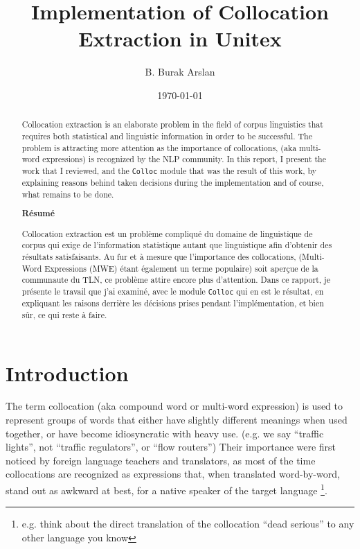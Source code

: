 \documentclass[a4paper,12pt,oneside]{article}
\title{Implementation of Collocation Extraction in Unitex}
\author{B. Burak Arslan}
\date{\today}
\begin{document}
\maketitle
\begin{abstract}
Collocation extraction is an elaborate problem in the field of corpus linguistics that requires both statistical and linguistic information in order to be successful. The problem is attracting more attention as the importance of collocations, (aka multi-word expressions) is recognized by the NLP community. In this report, I present the work that I reviewed, and the \texttt{Colloc} module that was the result of this work, by explaining reasons behind taken decisions during the implementation and of course, what remains to be done.

\begin{center}
\textbf{Résumé}
\end{center}

Collocation extraction est un problème compliqué du domaine de
linguistique de corpus qui exige de l'information statistique autant que
linguistique afin d'obtenir des résultats satisfaisants. Au fur et à
mesure que l'importance des collocations, (Multi-Word Expressions (MWE)
étant également un terme populaire) soit aperçue de la communaute du
TLN, ce problème attire encore plus d'attention. Dans ce rapport, je
présente le travail que j'ai examiné, avec le module \texttt{Colloc}
qui en est le résultat, en expliquant les raisons derrière les décisions 
prises pendant l'implémentation, et bien sûr, ce qui reste à faire.

\end{abstract}

\section{Introduction}
The term collocation (aka compound word or multi-word expression) is used to represent groups of words that either have slightly different meanings when used together, or have become idiosyncratic with heavy use. 
(e.g. we say ``traffic lights'', not ``traffic regulators'', or ``flow routers'')
Their importance were first noticed by foreign language teachers and translators, as most of the time collocations are recognized as expressions that, when translated word-by-word, stand out as awkward at best, for a native speaker of the target language
\footnote{e.g. think about the direct translation of the collocation ``dead serious'' to any other language you know}. 
\end{document}
